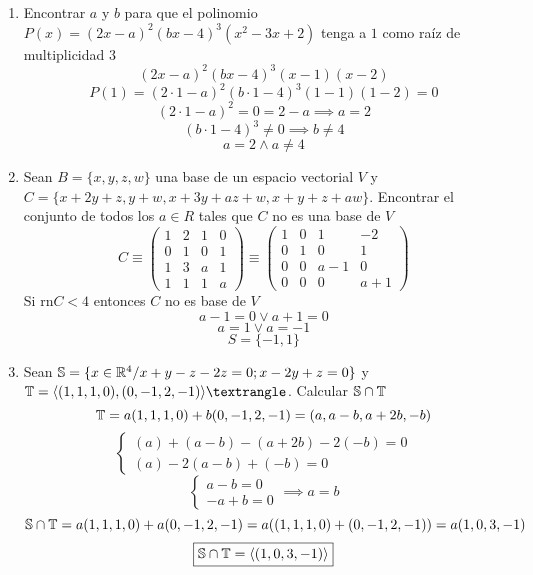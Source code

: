 \documentclass[../practica.root.tex]{subfiles}
\begin{document}
\begin{enumerate}
    \item Encontrar $a$ y $b$ para que el polinomio $P(x) = (2x-a)^2(bx-4)^3(x^2-3x+2)$ tenga a $1$ como raíz de multiplicidad $3$ %
          \[ (2x - a)^2 (bx - 4)^3 (x - 1)(x - 2) \]
          \[ P(1) = (2\cdot 1 - a)^2 (b\cdot 1 - 4)^3 (1 - 1)(1 - 2) = 0 \]
          \[ (2\cdot 1 - a)^2 = 0 = 2 - a \implies a = 2 \]
          \[ (b\cdot 1 - 4)^3 \neq 0 \implies b \neq 4 \]
          \[ \boxed{a = 2 \land a \neq 4} \]

    \item Sean $B = \{x, y, z, w\}$ una base de un espacio vectorial $V$ y $C = \{x + 2y + z,y + w,x + 3y + az + w,x + y + z + aw\}$. Encontrar el conjunto de todos los $a \in R$ tales que $C$ no es una base de $V$ %
          \[
              C \equiv \begin{pmatrix}
                  1 & 2 & 1 & 0 \\
                  0 & 1 & 0 & 1 \\
                  1 & 3 & a & 1 \\
                  1 & 1 & 1 & a
              \end{pmatrix}
              \equiv
              \begin{pmatrix}
                  1 & 0 & 1   & -2  \\
                  0 & 1 & 0   & 1   \\
                  0 & 0 & a-1 & 0   \\
                  0 & 0 & 0   & a+1
              \end{pmatrix}
          \]
          Si \(\text{rn} C < 4\) entonces \(C\) no es base de \(V\)
          \[ a - 1 = 0 \lor a + 1 = 0\]
          \[ a = 1 \lor a = - 1 \]
          \[ \boxed{S = \{-1, 1\}} \]

    \item Sean $\mathbb{S} = \{x \in \mathbb{R}^4 / x + y - z - 2z = 0; x - 2y + z = 0\}$ y $\T = \langle(1,1,1,0),(0,-1,2,-1)\rangle⟩$. Calcular $\mathbb{S} \cap \mathbb{T}$ %
          \[
              \mathbb{T} = a(1,1,1,0) + b(0,-1,2,-1) = (a, a-b, a+2b, -b)
          \] \[
              \begin{cases}
                  (a) + (a-b) - (a+2b) - 2(-b) = 0 \\
                  (a) - 2(a-b) + (-b) = 0
              \end{cases}
          \] \[
              \begin{cases}
                  a - b = 0 \\
                  -a + b = 0
              \end{cases}
              \implies
              a = b
          \] \[
              \mathbb{S}\cap\mathbb{T} = a(1,1,1,0) + a(0,-1,2,-1) = a((1,1,1,0) + (0,-1,2,-1)) = a(1,0,3,-1)
          \] \[
              \boxed{\mathbb{S}\cap\mathbb{T} = \langle(1,0,3,-1)\rangle}
          \]


\end{enumerate}
\end{document}
